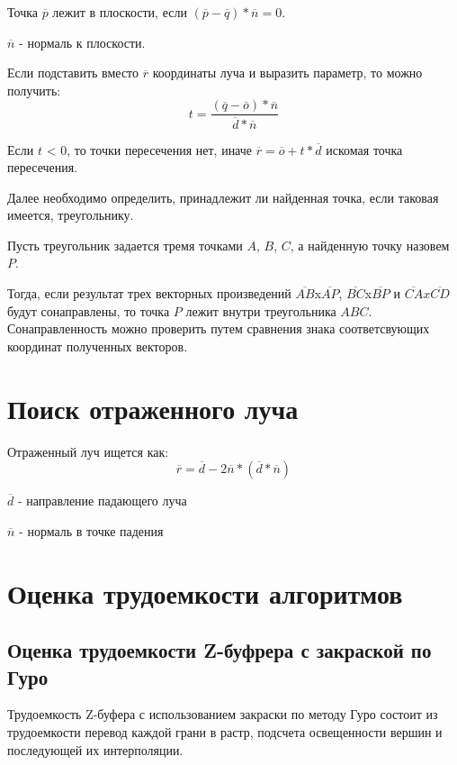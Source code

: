 \documentclass[12pt]{report}
\begin{document}
	Точка $\overline{p}$ лежит в плоскости, если $(\overline{p} - \overline{q})*\overline{n} = 0$. 
	
	$\overline{n}$ - нормаль к плоскости.
	
	Если подставить вместо $\overline{r}$ координаты луча и выразить параметр, то можно получить:
	\begin{equation}
		t = \frac{(\overline{q} - \overline{o})*\overline{n}}{\overline{d}*\overline{n}}
	\end{equation}
	
	Если $t$ < 0, то точки пересечения нет, иначе $\overline{r} = \overline{o} + t*\overline{d}$ искомая точка пересечения.
	
	Далее необходимо определить, принадлежит ли найденная точка, если таковая имеется, треугольнику.
	
	Пусть треугольник задается тремя точками $A$, $B$, $C$, а найденную точку назовем $P$.
	
	Тогда, если результат трех векторных произведений $\overline{AB}$x$\overline{AP}$, $\overline{BC}$x$\overline{BP}$ и $\overline{CA}x\overline{CD}$ будут сонаправлены, то точка $P$ лежит внутри треугольника $ABC$. Сонаправленность можно проверить путем сравнения знака соответсвующих координат полученных векторов.
	
	\section{Поиск отраженного луча}

	Отраженный луч ищется как:
	\begin{equation}
		\overline{r} = \overline{d} - 2\overline{n}*(\overline{d}*\overline{n})
	\end{equation}
	
	$\overline{d}$ - направление падающего луча
	
	$\overline{n}$ - нормаль в точке падения

	\section{Оценка трудоемкости алгоритмов}
	
	\subsection{Оценка трудоемкости Z-буфрера с закраской по Гуро}
	
	Трудоемкость Z-буфера с использованием закраски по методу Гуро состоит из трудоемкости перевод каждой грани в растр, подсчета освещенности вершин и последующей их интерполяции.
	
\end{document}
